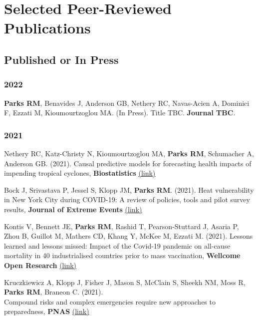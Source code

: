\section*{Selected Peer-Reviewed Publications}

\subsection*{Published or In Press}

\subsubsection*{2022}

\noindent \textbf{Parks RM}, Benavides J, Anderson GB, Nethery RC, Navas-Acien A, Dominici F, Ezzati M, Kioumourtzoglou MA. (In Press). Title TBC. \textbf{Journal TBC}.

\subsubsection*{2021}

\noindent Nethery RC, Katz-Christy N, Kioumourtzoglou MA, \textbf{Parks RM}, Schumacher A, Anderson GB. (2021). Causal predictive models for forecasting health impacts of impending tropical cyclones, \textbf{Biostatistics} \href{https://academic.oup.com/biostatistics/advance-article/doi/10.1093/biostatistics/kxab047/6485226?guestAccessKey=378fb8f6-102d-4b21-a93d-b0a01353c19f#}{(link)} \medskip

\noindent Bock J, Srivastava P, Jessel S, Klopp JM, \textbf{Parks RM}. (2021). Heat vulnerability in New York City during COVID-19: A review of policies, tools and pilot survey results, \textbf{Journal of Extreme Events} \href{https://www.worldscientific.com/doi/10.1142/S2345737621500159}{(link)} \medskip

\noindent Kontis V, Bennett JE, \textbf{Parks RM}, Rashid T, Pearson-Stuttard J, Asaria P, Zhou B, Guillot M, Mathers CD, Khang Y, McKee M, Ezzati M. (2021). Lessons learned and lessons missed: Impact of the Covid-19 pandemic on all-cause mortality in 40 industrialised countries prior to mass vaccination, \textbf{Wellcome Open Research} \href{https://wellcomeopenresearch.org/articles/6-279/v1}{(link)} \medskip

\noindent Kruczkiewicz A, Klopp J, Fisher J, Mason S, McClain S, Sheekh NM, Moss R, \textbf{Parks RM}, Braneon C. (2021).\\Compound risks and complex emergencies require new approaches to preparedness, \textbf{PNAS} \href{https://www.pnas.org/content/118/19/e2106795118}{(link)} \medskip

